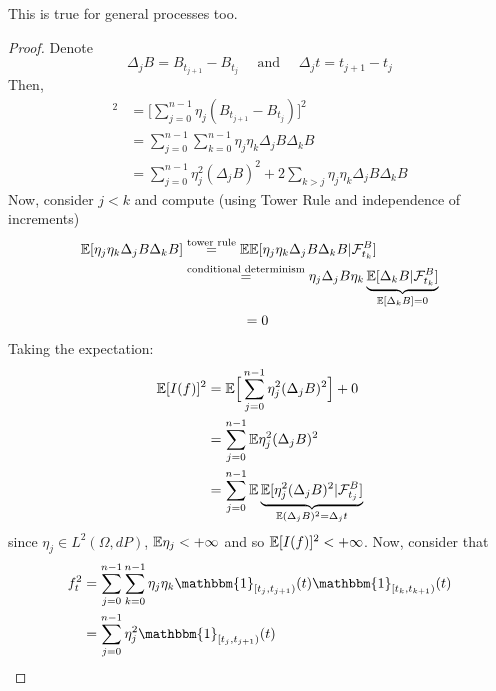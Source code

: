 \begin{remark}
    This is true for general processes too.
\end{remark}
\begin{ProofBox}
    \begin{proof}
Denote 
    \begin{equation*}
        \Delta_jB = B_{t_{j+1}} - B_{t_j} \quad \text{ and }  \quad \Delta_j t= t_{j+1} - t_j
    \end{equation*}
    Then,
    \begin{align*}
        [I(f)]^2 &= \Big[\sum_{j=0}^{n-1} \eta_j (B_{t_{j+1}} - B_{t_j})\Big]^2 \\
        &= \sum_{j=0}^{n-1}\sum_{k=0}^{n-1}\eta_j\eta_k \Delta_j B\Delta_k B    \\
        &= \sum_{j=0}^{n-1} \eta_j^2 (\Delta_j B)^2 + 2 \sum_{k>j} \eta_j\eta_k \Delta_j B\Delta_k B 
    \end{align*}
    Now, consider $j < k$ and compute (using Tower Rule and independence of increments)
    \begin{align*}
        \mE [\eta_j \eta_k \Delta_j B \Delta_k B] & \hspace{0 cm } \stackrel{ \text{tower rule}}{=} \mathbb{E} \mathbb{E}[\eta_j \eta_k \Delta_j B \Delta_k B | \mathcal{F}_{t_k}^B] \\
    &\stackrel{\text{conditional determinism}}{=} \eta_j \Delta_j B \eta_k \underbrace{\mE[\Delta_k B| \mathcal{F}_{t_k}^B ]}_{\mathbb{E}[\Delta_k B] = 0} \\
    & \hspace{1,5 cm }= 0\\
    \end{align*}
Taking the expectation:
    \begin{align*}
    \mathbb{E}[I(f)]^2 &= \mathbb{E}\Big[\sum_{j=0}^{n-1} \eta_j^2(\Delta_j B)^2\Big] +0 \\
    &= \sum_{j=0}^{n-1}\mathbb{E} \eta_j^2 (\Delta_j B)^2\\
    &= \sum_{j=0}^{n-1}{\mathbb{E} \underbrace{ \mathbb{E} [\eta_j^2(\Delta_j B)^2 |\mathcal{F}_{t_j}^B]}_{\mathbb{E}(\Delta_j B)^2= \Delta_j t}}
    \end{align*}
    since $ \eta_j \in L^2(\Omega, dP)$,  $\mathbb{E} \eta_j < + \infty$ and so  $\mathbb{E} [I(f)]^2 < + \infty$. Now, consider that 
    \begin{align*}
        f_t^2 &= \sum_{j = 0}^{n-1} \sum_{k=0}^{n-1} \eta_j \eta_k \mathbbm{1}_{[t_j,t_{j+1})}{(t)} \mathbbm{1}_{[t_k, t_{k+1})}{(t)}\\
        &= \sum_{j = 0}^{n-1} \eta_j^2 \mathbbm{1}_{[t_j, t_{j+1})}{(t)} 

\end{align*}
\end{proof}
\end{ProofBox}

